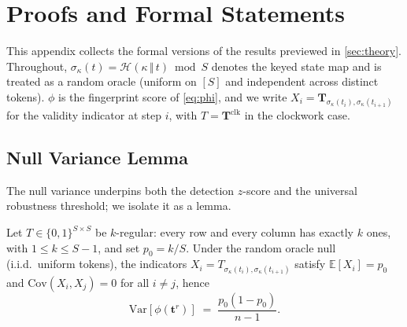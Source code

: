 \section{Proofs and Formal Statements}
\label{app:proofs}

This appendix collects the formal versions of the results previewed
in \autoref{sec:theory}.  Throughout, $\sigma_\kappa(t) = \mathcal{H}(\kappa
\,\Vert\, t) \bmod S$ denotes the keyed state map and is treated as a
random oracle (uniform on $[S]$ and independent across
distinct tokens).  $\phi$ is the fingerprint score of
\autoref{eq:phi}, and we write $X_i =
\mathbf{T}_{\sigma_\kappa(t_i),\sigma_\kappa(t_{i+1})}$ for the validity
indicator at step $i$, with $T = \mathbf{T}^{\mathrm{clk}}$ in the
clockwork case.

\subsection{Null Variance Lemma}
\label{subsec:proof-variance}

The null variance underpins both the detection $z$-score and the
universal robustness threshold; we isolate it as a lemma.

\begin{lemma}
  \label{lem:variance}
  Let $T \in \{0,1\}^{S \times S}$ be $k$-regular: every row and
  every column has exactly $k$ ones, with $1 \leq k \leq S{-}1$, and
  set $p_0 = k/S$.  Under the random oracle null
  (i.i.d.\ uniform tokens), the indicators
  $X_i = T_{\sigma_\kappa(t_i), \sigma_\kappa(t_{i+1})}$ satisfy
  $\mathbb{E}[X_i] = p_0$ and $\mathrm{Cov}(X_i, X_j) = 0$ for all
  $i \neq j$, hence
  \begin{equation}
    \mathrm{Var}\!\left[\phi(\mathbf{t}^r)\right]
      \;=\; \frac{p_0 (1 - p_0)}{n-1}.
    \label{eq:null-variance}
  \end{equation}
\end{lemma}

